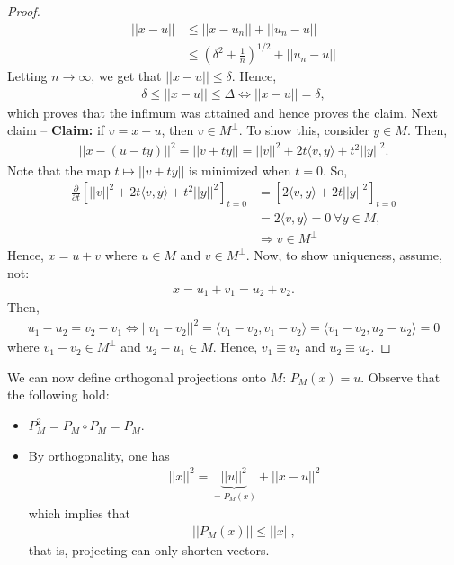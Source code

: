 \documentclass[psamsfonts]{amsart}
\theoremstyle{definition}
\theoremstyle{remark}
\numberwithin{equation}{section}
\begin{document}
\begin{proof}
	\begin{align*}
		|| x - u || &  \leq ||x-u_n|| + ||u_n - u || \\
					& \leq \left( \delta^2 + \frac{1}{n} \right)^{1/2} + ||u_n - u||
	\end{align*}
	Letting \( n \rightarrow \infty\), we get that \( ||x-u|| \leq \delta \). Hence, 
	\begin{align*}
		\delta \leq ||x-u|| \leq \Delta \iff ||x-u|| = \delta,
	\end{align*}
	which proves that the infimum was attained and hence proves the claim. Next claim -- \textbf{Claim:} if \( v = x-u \), then \( v \in M^\perp \). To show this, consider \( y \in M \). Then, 
	\begin{align*}
		|| x - (u-ty)||^2 = || v + ty|| = ||v||^2 + 2t \langle v, y \rangle + t^2 ||y||^2.
	\end{align*}
	Note that the map \( t \mapsto || v+ty|| \) is minimized when \( t = 0 \). So, 
	\begin{align*}
		\frac{\partial}{\partial t} \left[ ||v||^2 + 2t \langle v, y \rangle + t^2 ||y||^2 \right]_{t=0} & = [2 \langle v, y \rangle + 2t ||y||^2 ]_{t = 0 } \\
		& = 2 \langle v, y \rangle = 0\ \forall y \in M, \\
		& \Rightarrow v \in M^\perp 
	\end{align*}
	Hence, \( x = u + v \) where \( u \in M \) and \( v \in M^\perp \). Now, to show uniqueness, assume, not: 
	\begin{align*}
		x = u_1 + v_1 = u_2 + v_2.
	\end{align*}
	Then, 
	\begin{align*}
		u_1 - u_2 = v_2 - v_1 \iff ||v_1 - v_2||^2 = \langle v_1 - v_2, v_1 - v_2 \rangle = \langle v_1 - v_2, u_2 - u_2 \rangle = 0 
	\end{align*}
	where \( v_1 - v_2 \in M^\perp \) and \( u_2 - u_1 \in M \). Hence, \( v_1 \equiv v_2 \) and \( u_2 \equiv u_2 \).
\end{proof}

We can now define orthogonal projections onto \( M \): \( P_M(x) = u \). Observe that the following hold:

\begin{itemize}
	\item \( P_M^2 = P_M \circ P_M = P_M \). 
	\item By orthogonality, one has
	\begin{align*}
		||x||^2 = \underbrace{||u||^2}_{=P_M(x)} + ||x-u||^2
	\end{align*}
	which implies that
	\begin{align*}
		||P_M(x) || \leq ||x||,
	\end{align*}
	that is, projecting can only shorten vectors.
\end{itemize}
\end{document}
